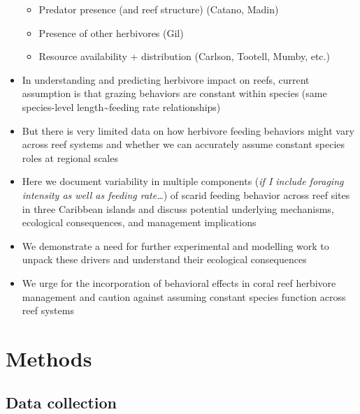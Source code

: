 \documentclass[]{article}
\providecommand{\tightlist}{%
  \setlength{\itemsep}{0pt}\setlength{\parskip}{0pt}}
\begin{document}
\begin{itemize}
  \begin{itemize}
  \tightlist
  \item
    Predator presence (and reef structure) (Catano, Madin)
  \item
    Presence of other herbivores (Gil)
  \item
    Resource availability + distribution (Carlson, Tootell, Mumby, etc.)
  \end{itemize}
\item
  In understanding and predicting herbivore impact on reefs, current
  assumption is that grazing behaviors are constant within species (same
  species-level length\textasciitilde{}feeding rate relationships)
\item
  But there is very limited data on how herbivore feeding behaviors
  might vary across reef systems and whether we can accurately assume
  constant species roles at regional scales
\item
  Here we document variability in multiple components (\emph{if I
  include foraging intensity as well as feeding rate\ldots{}}) of scarid
  feeding behavior across reef sites in three Caribbean islands and
  discuss potential underlying mechanisms, ecological consequences, and
  management implications
\item
  We demonstrate a need for further experimental and modelling work to
  unpack these drivers and understand their ecological consequences
\item
  We urge for the incorporation of behavioral effects in coral reef
  herbivore management and caution against assuming constant species
  function across reef systems
\end{itemize}

\section{Methods}\label{methods}

\subsection{Data collection}\label{data-collection}
\end{document}

